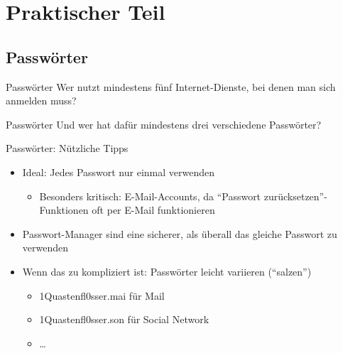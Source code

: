 \section{Praktischer Teil}
  \subsection{Passwörter}
    \begin{frame}{Passwörter}
      \Large Wer nutzt mindestens fünf Internet-Dienste, bei denen man sich anmelden muss?
    \end{frame}
    \begin{frame}{Passwörter}
      \Large Und wer hat dafür mindestens drei verschiedene Passwörter?
    \end{frame}
    \begin{frame}{Passwörter: Nützliche Tipps}
      \begin{itemize}
        \item Ideal: Jedes Passwort nur einmal verwenden
        \begin{itemize}
          \item Besonders kritisch: E-Mail-Accounts, da ``Passwort zurücksetzen''-Funktionen oft per E-Mail funktionieren
        \end{itemize}
        \item Passwort-Manager sind eine sicherer, als überall das gleiche Passwort zu verwenden
        \item Wenn das zu kompliziert ist: Passwörter leicht variieren (``salzen'')
        \begin{itemize}
          \item 1Quastenfl0sser.mai für Mail
          \item 1Quastenfl0sser.son für Social Network
          \item \ldots
        \end{itemize}
      \end{itemize}
    \end{frame}
